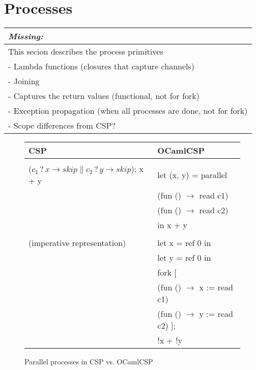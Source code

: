 \documentclass[11pt,oneside,a4paper]{article}
\newcommand{\missing}[1]{
\begin{tabular}{|p{11cm}|}
\hline
\emph{Missing:} \\
\hline
#1
\hline
\end{tabular}
}
\begin{document}
\section{Processes}
\missing{
This secion describes the process primitives \\
- Lambda functions (closures that capture channels) \\
- Joining \\
- Captures the return values (functional, not for fork) \\
- Exception propagation (when all processes are done, not for fork) \\
- Scope differences from CSP? \\
}

\begin{figure}[h]
\centering
\begin{tabular}{l|l}
CSP & OCamlCSP \\
\hline
& \\
($c_1\,?\,x \to skip \parallel c_2\,?\,y \to skip$); x + y & let (x, y) = parallel \\
& \quad (fun () $\to$ read c1) \\
& \quad (fun () $\to$ read c2) \\
& in x + y \\
& \\
(imperative representation) & let x = ref 0 in \\
& let y = ref 0 in \\
& fork [ \\
& \quad (fun () $\to$ x := read c1) \\
& \quad (fun () $\to$ y := read c2) ]; \\
& !x + !y \\
\end{tabular}
\caption{Parallel processes in CSP vs. OCamlCSP}
\label{channel-alternation}
\end{figure}
\end{document}

